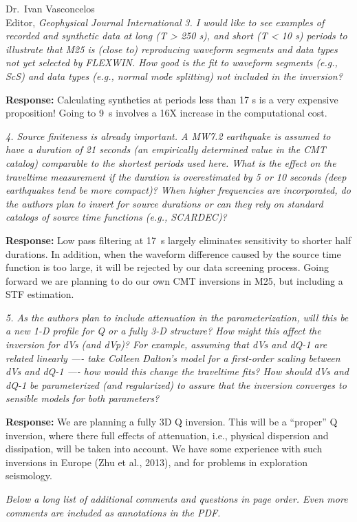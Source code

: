 \documentclass[11pt,a4paper]{letter}
\newcommand{\response}[1]{\textbf{Response:} #1}
\newcommand{\rev}[1]{{\it{#1}}}
\begin{document}
\begin{letter}{Dr.~Ivan Vasconcelos\\
Editor, \textit{Geophysical Journal International}}
\rev{3. I would like to see examples of recorded and synthetic data at long (T > 250 s), and short (T < 10 s) periods to illustrate that M25 is (close to) reproducing waveform segments and data types not yet selected by FLEXWIN. How good is the fit to waveform segments (e.g., ScS) and data types (e.g., normal mode splitting) not included in the inversion?
}

\response{Calculating synthetics at periods less than 17 s is a very expensive proposition! Going to 9~s involves a 16X increase in the computational cost.
}

\rev{4. Source finiteness is already important. A MW7.2 earthquake is assumed to have a duration of 21 seconds (an empirically determined value in the CMT catalog) comparable to the shortest periods used here. What is the effect on the traveltime measurement if the duration is overestimated by 5 or 10 seconds (deep earthquakes tend be more compact)? When higher frequencies are incorporated, do the authors plan to invert for source durations or can they rely on standard catalogs of source time functions (e.g., SCARDEC)?
}

\response{Low pass filtering at 17~s largely eliminates sensitivity to shorter half durations. 
In addition, when the waveform difference caused by the source time function is too large, it will be rejected by our data screening process. Going forward we are planning to do our own CMT inversions in M25, but including a STF estimation.
}

\rev{5. As the authors plan to include attenuation in the parameterization, will this be a new 1-D profile for Q or a fully 3-D structure? How might this affect the inversion for dVs (and dVp)? For example, assuming that dVs and dQ-1 are related linearly ---- take Colleen Dalton's model for a first-order scaling between dVs and dQ-1 ---- how would this change the traveltime fits? How should dVs and dQ-1 be parameterized (and regularized) to assure that the inversion converges to sensible models for both parameters?
}

\response{We are planning a fully 3D Q inversion. This will be a ``proper'' Q inversion,
where there full effects of attenuation, i.e., physical dispersion and dissipation, will be taken into account. We have some experience with such inversions in Europe (Zhu et al., 2013), and for problems in exploration seismology.
}

\rev{Below a long list of additional comments and questions in page order. Even more comments are included as annotations in the PDF.}


\end{letter}
\end{document}
